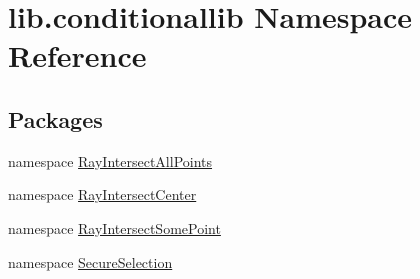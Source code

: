 \hypertarget{namespacelib_1_1conditionallib}{\section{lib.\-conditionallib Namespace Reference}
\label{namespacelib_1_1conditionallib}
}
\subsection*{Packages}
\begin{DoxyCompactItemize}
\item 
namespace \hyperlink{namespacelib_1_1conditionallib_1_1_ray_intersect_all_points}{Ray\-Intersect\-All\-Points}
\item 
namespace \hyperlink{namespacelib_1_1conditionallib_1_1_ray_intersect_center}{Ray\-Intersect\-Center}
\item 
namespace \hyperlink{namespacelib_1_1conditionallib_1_1_ray_intersect_some_point}{Ray\-Intersect\-Some\-Point}
\item 
namespace \hyperlink{namespacelib_1_1conditionallib_1_1_secure_selection}{Secure\-Selection}
\end{DoxyCompactItemize}

